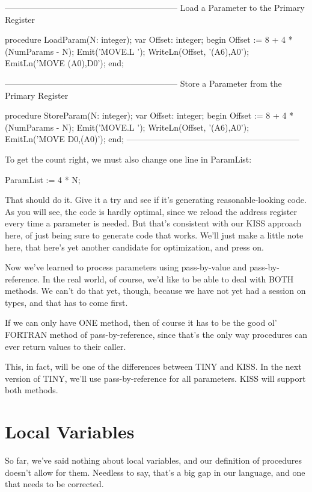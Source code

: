 \documentclass[float=false, crop=false]{standalone}
\begin{document}
{--------------------------------------------------------------}
{ Load a Parameter to the Primary Register }

procedure LoadParam(N: integer);
var Offset: integer;
begin
     Offset := 8 + 4 * (NumParams - N);
     Emit('MOVE.L ');
     WriteLn(Offset, '(A6),A0');
     EmitLn('MOVE (A0),D0');
end;


{--------------------------------------------------------------}
{ Store a Parameter from the Primary Register }

procedure StoreParam(N: integer);
var Offset: integer;
begin
     Offset := 8 + 4 * (NumParams - N);
     Emit('MOVE.L ');
     WriteLn(Offset, '(A6),A0');
     EmitLn('MOVE D0,(A0)');
end;
{--------------------------------------------------------------}

To get the count right, we must also change one line in ParamList:


     ParamList := 4 * N;


That should do it. Give it a try and see if it's generating reasonable-looking
code. As you will see, the code is hardly optimal, since we reload the address
register every time a parameter is needed. But that's consistent with our KISS
approach here, of just being sure to generate code that works. We'll just make a
little note here, that here's yet another candidate for optimization, and press
on.

Now we've learned to process parameters using pass-by-value and
pass-by-reference. In the real world, of course, we'd like to be able to deal
with BOTH methods. We can't do that yet, though, because we have not yet had a
session on types, and that has to come first.

If we can only have ONE method, then of course it has to be the good ol' FORTRAN
method of pass-by-reference, since that's the only way procedures can ever
return values to their caller.

This, in fact, will be one of the differences between TINY and KISS. In the next
version of TINY, we'll use pass-by-reference for all parameters. KISS will
support both methods.


\section{Local Variables}

So far, we've said nothing about local variables, and our definition of
procedures doesn't allow for them. Needless to say, that's a big gap in our
language, and one that needs to be corrected.
\end{document}
